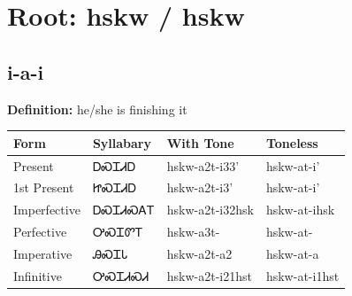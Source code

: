\documentclass{article}%
\begin{document}
%
\normalsize%
\section*{Root: hskw / hskw}%
\subsection*{i-a-i}%
\textbf{Definition: }%
he/she is finishing it%
\\[0.5em]%
\begin{tabular}{|l|l|l|l|}%
\hline%
\textbf{Form}&\textbf{Syllabary}&\textbf{With Tone}&\textbf{Toneless}\\%
\hline%
Present&ᎠᏍᏆᏗᎠ&hskw{-}a2t{-}i33'&hskw{-}at{-}i'\\%
1st Present&ᏥᏍᏆᏗᎠ&hskw{-}a2t{-}i3'&hskw{-}at{-}i'\\%
Imperfective&ᎠᏍᏆᏗᏍᎪᎢ&hskw{-}a2t{-}i32hsk&hskw{-}at{-}ihsk\\%
Perfective&ᎤᏍᏆᏛᎢ&hskw{-}a3t{-}&hskw{-}at{-}\\%
Imperative&ᎯᏍᏆᏓ&hskw{-}a2t{-}a2&hskw{-}at{-}a\\%
Infinitive&ᎤᏍᏆᏗᏍᏗ&hskw{-}a2t{-}i21hst&hskw{-}at{-}i1hst\\%
\hline%
\end{tabular}%
\\[1em]%
\end{document}
